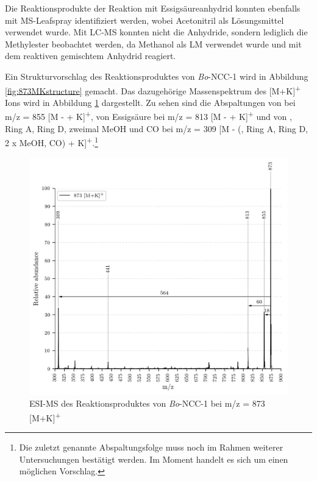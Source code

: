 \documentclass[12pt,a4paper]{article}
\begin{document}
Die Reaktionsprodukte der Reaktion mit Essigsäureanhydrid konnten ebenfalls mit MS-Leafspray identifiziert werden, wobei Acetonitril als Lösungsmittel verwendet wurde. Mit LC-MS konnten nicht die Anhydride, sondern lediglich die Methylester beobachtet werden, da Methanol als LM verwendet wurde und mit dem reaktiven gemischtem Anhydrid reagiert. 

Ein Strukturvorschlag des Reaktionsproduktes von \textit{Bo}-NCC-1 wird in Abbildung \ref{fig:873MKstructure} gemacht. Das dazugehörige Massenspektrum des [M+K]\textsuperscript{+} Ions wird in Abbildung \ref{fig:873MKLeafspray} dargestellt. Zu sehen sind die Abspaltungen von  bei m/z = 855 [M -  + K]\textsuperscript{+}, von Essigsäure bei m/z = 813 [M -  + K]\textsuperscript{+} und von , Ring A, Ring D, zweimal MeOH und CO bei m/z = 309 [M - (, Ring A, Ring D, 2 x MeOH, CO) + K]\textsuperscript{+}.\footnote{Die zuletzt genannte Abspaltungsfolge muss noch im Rahmen weiterer Untersuchungen bestätigt werden. Im Moment handelt es sich um einen möglichen Vorschlag.}

\begin{figure}[htbp]
  \includegraphics[width=\textwidth, height=0.7\textwidth]{figures/Kapitel4/Kataboliten/VWA_MS_LeafSpray_873.png} 
  \caption[ESI-MS des Reaktionsproduktes von \textit{Bo}-NCC-1, Quelle: Autor]{ESI-MS des Reaktionsproduktes von \textit{Bo}-NCC-1 bei m/z = 873 [M+K]\textsuperscript{+}}
  \label{fig:873MKLeafspray}
\end{figure}
\end{document}
